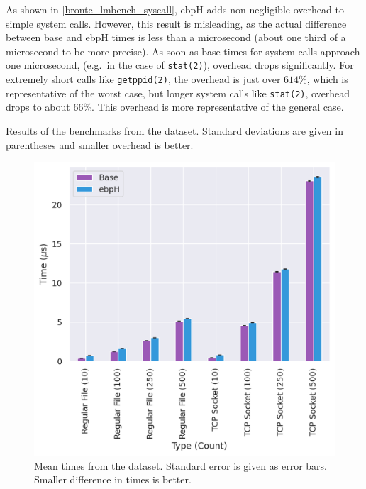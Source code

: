 \documentclass[
  12pt]{findlay}
\newcommand{\passthrough}[1]{#1}
\begin{document}
As shown in \autoref{bronte_lmbench_syscall}, ebpH adds non-negligible
overhead to simple system calls. However, this result is misleading, as
the actual difference between base and ebpH times is less than a
microsecond (about one third of a microsecond to be more precise). As
soon as base times for system calls approach one microsecond, (e.g.~in
the case of \passthrough{\lstinline!stat(2)!}), overhead drops
significantly. For extremely short calls like
\passthrough{\lstinline!getppid(2)!}, the overhead is just over
\(614\%\), which is representative of the worst case, but longer system
calls like \passthrough{\lstinline!stat(2)!}, overhead drops to about
\(66\%\). This overhead is more representative of the general case.

\FloatBarrier

\begin{table}
    \caption[Results of the  benchmarks from the  dataset]{
        Results of the  benchmarks from the  dataset.
        Standard deviations are given in parentheses and smaller overhead is better.
    }
    \label{bronte_lmbench_select}
    
\end{table}

\begin{figure}
    \caption[Mean  times from the  dataset]{
        Mean  times from the  dataset.
        Standard error is given as error bars.
        Smaller difference in times is better.
    }
    \label{bronte_lmbench_select_graph}
    \includegraphics[width=.6\textwidth]{../data/bench/bronte-lmbench/select_times.png}
\end{figure}
\end{document}
